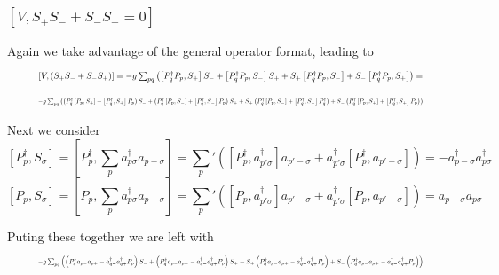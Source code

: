 \documentclass[11pt]{article} %
\begin{document}
\subsubsection{$\left[V,S_+S_-+S_-S_+=0\right]$	}

Again we take advantage of the general operator format, leading to\\
\begin{equation}
\resizebox{.9\hsize}{!}{$
\left[V,\left(S_+S_- +S_-S_+ \right)\right] =-g\sum_{pq} \left(\left[P_q^\dagger P_p ,S_+\right]S_-+\left[P_q^\dagger P_p ,S_-\right]S_+ + S_+\left[P_q^\dagger P_p,S_-\right]+S_-\left[P_q^\dagger P_p,S_+\right]\right)=$}
\end{equation}
\begin{equation}
\resizebox{.9\hsize}{!}{$
-g\sum_{pq} \left(\left(P_q^\dagger\left[ P_p ,S_+\right]+\left[ P_q^\dagger ,S_+\right]P_p\right)S_-+
\left(P_q^\dagger\left[ P_p ,S_-\right]+\left[P_q^\dagger,S_-\right]P_p\right)S_+ + S_+\left(P_q^\dagger \left[ P_p,S_-\right]+\left[P_q^\dagger,S_-\right]P_q^\dagger \right)+S_-\left(P_q^\dagger\left[ P_p,S_+\right]+\left[P_q^\dagger,S_+\right]P_p \right)\right)$}
\end{equation}

Next we consider\\

\begin{equation}
\left[P_p^\dagger , S_\sigma \right]=\left[P_p^\dagger, \sum_p a_{p\sigma}^\dagger a_{p-\sigma}\right]=
\sum_p' \left(\left[P_p^\dagger,  a_{p'\sigma}^\dagger \right]a_{p'-\sigma}+a_{p'\sigma}^\dagger \left[P_p^\dagger,a_{p'-\sigma}\right]\right)= -a_{p-\sigma}^\dagger a_{p\sigma}^\dagger
\end{equation}
\begin{equation}
\left[P_p , S_\sigma \right]=\left[P_p, \sum_p a_{p\sigma}^\dagger a_{p-\sigma}\right]=
\sum_p' \left(\left[P_p,  a_{p'\sigma}^\dagger \right]a_{p'-\sigma}+a_{p'\sigma}^\dagger \left[P_p,a_{p'-\sigma}\right]\right)= a_{p-\sigma} a_{p\sigma}
\end{equation}

Puting these together we are left with\\
\begin{equation}
\resizebox{.9\hsize}{!}{$
-g\sum_{pq} \left(\left(P_q^\dagger a_{p-}a_{p+} -a_{q-}^\dagger a_{q+}^\dagger  P_p\right)S_-+
\left(P_q^\dagger a_{p-}a_{p+}-a_{q-}^\dagger a_{q+}^\dagger P_p\right)S_+ + S_+\left(P_q^\dagger a_{p-}a_{p+}-a_{q-}^\dagger a_{q+}^\dagger P_p \right)+S_-\left(P_q^\dagger a_{p-}a_{p+}-a_{q-}^\dagger a_{q+}^\dagger P_p \right)\right)$}
\end{equation}
\end{document}
